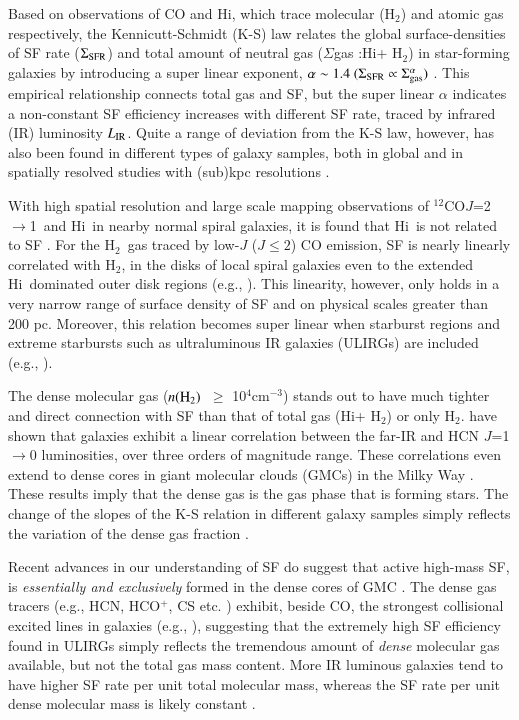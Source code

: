 \documentclass[legal,11pt]{article}
\def\cmt   {cm$^{-3}$\,}
\def\,{\thinspace}
\def\HI{H{\sc i}}
\def\Htwo{H$_2$}
\def\nHtwo{$n({\rm H}_2)$}
\def\LIR     {$L_{\rm IR}$}
\def\Htwo       {H$_2$}
\def\COto      {$^{12}$CO$J$=2$\rightarrow$1}
\begin{document}
Based on observations of CO and \HI, which trace molecular (\Htwo) and atomic
gas respectively, the Kennicutt-Schmidt (K-S) law relates the global
surface-densities of SF rate ($\Sigma_{\rm SFR}$) and total amount of neutral
gas ($\Sigma$gas :\HI + \Htwo) in star-forming galaxies by introducing a super
linear exponent, $\alpha \sim 1.4 ~ (\Sigma_{\rm SFR} \propto \Sigma_{\rm
gas}^\alpha)$ \citep{Kennicutt2012}. This empirical relationship connects total
gas and SF, but the super linear $\alpha$ indicates a non-constant SF
efficiency increases with  different SF rate, traced by infrared (IR)
luminosity \LIR. Quite a range of deviation from the K-S law, however, has also
been found in different types of galaxy samples, both in global and in
spatially resolved studies with (sub)kpc resolutions
\citep[e.g.,][]{Kennicutt2012,Bigiel2008}.  


With high spatial resolution and large scale mapping observations of \COto\ and
\HI\ in nearby normal spiral galaxies, it is found that \HI\ is not related to
SF \citep[e.g.,][]{Bigiel2008}. For the \Htwo\ gas traced by low-$J$ ($J\le2$)
CO emission, SF is nearly linearly correlated with \Htwo, in the disks of local
spiral galaxies even to the extended \HI\ dominated outer disk
regions (e.g., \citealt{Bigiel2008,Schruba2011,Leroy2013}). This linearity,
however, only holds in a very narrow range of surface density of SF and on
physical scales greater than 200 pc.  Moreover, this relation becomes super
linear when starburst regions and extreme starbursts such as ultraluminous
IR galaxies (ULIRGs) are included (e.g.,
\citealt{Genzel2010,Daddi2010a}).  


The dense molecular gas (\nHtwo\ $\ge$ 10$^4$\cmt) stands out to have much
tighter and direct connection with SF than that of total gas (\HI + \Htwo) or
only \Htwo. \citet[][see Fig. \ref{fig:hcn10}]{gs04a,gs04b} have shown that 
galaxies exhibit a linear correlation between the far-IR and HCN $J$=1$\rightarrow$0 
luminosities, over three orders of magnitude range. These correlations even extend 
to dense cores in giant molecular clouds (GMCs) in the Milky Way \citep{weg05,zgh2014}.
These results imply that the dense gas is the gas phase that is forming
stars. The change of the slopes of the K-S relation in different galaxy samples
simply reflects the variation of the dense gas fraction \citep[e.g.,][]{Lada2010b}. 

Recent advances in our understanding of SF do suggest that active high-mass SF,
is {\it essentially and exclusively} formed in the dense cores of GMC
\citep[e.g.,][]{Evans08}. The dense gas tracers (e.g., HCN, HCO$^+$, CS etc. )
exhibit, beside CO, the strongest collisional excited lines in galaxies (e.g.,
\citealt{rwc06,gc08,Baan08,Greve14}), suggesting that the extremely high SF
efficiency found in ULIRGs simply reflects the tremendous amount of {\it dense}
molecular gas available, but not the total gas mass
content\citep[e.g.,][]{Lada2010b}.  More IR luminous galaxies tend to have
higher SF rate per unit total molecular mass, whereas the SF rate per unit
dense molecular mass is likely constant \citep[][]{gs04a,gs04b}.
\end{document}

